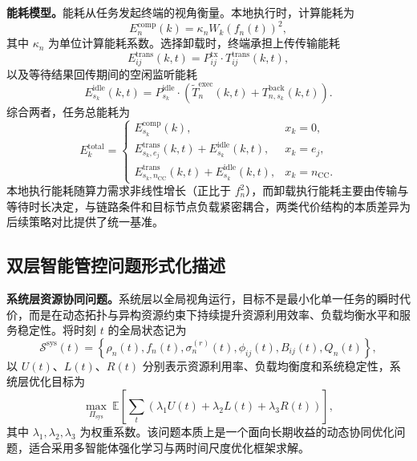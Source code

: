 \textbf{能耗模型。}能耗从任务发起终端的视角衡量。本地执行时，计算能耗为
\begin{equation}
  E_n^{\mathrm{comp}}(k)=\kappa_n W_k \left(f_n(t)\right)^2,
\end{equation}
其中 $\kappa_n$ 为单位计算能耗系数。选择卸载时，终端承担上传传输能耗
\begin{equation}
  E_{ij}^{\mathrm{trans}}(k,t)=P_{ij}^{\mathrm{tx}}\cdot T_{ij}^{\mathrm{trans}}(k,t),
\end{equation}
以及等待结果回传期间的空闲监听能耗
\begin{equation}
  E_{s_k}^{\mathrm{idle}}(k,t)=P_{s_k}^{\mathrm{idle}}\cdot\left(\tilde{T}_{n}^{\mathrm{exec}}(k,t)+T_{n,s_k}^{\mathrm{back}}(k,t)\right).
\end{equation}
综合两者，任务总能耗为
\begin{equation}
  E_k^{\mathrm{total}}=
  \begin{cases}
    E_{s_k}^{\mathrm{comp}}(k), & x_k=0, \\[4pt]
    E_{s_k,e_j}^{\mathrm{trans}}(k,t)+E_{s_k}^{\mathrm{idle}}(k,t), & x_k=e_j, \\[4pt]
    E_{s_k,n_{\mathrm{CC}}}^{\mathrm{trans}}(k,t)+E_{s_k}^{\mathrm{idle}}(k,t), & x_k=n_{\mathrm{CC}}.
  \end{cases}
\end{equation}
本地执行能耗随算力需求非线性增长（正比于 $f_n^2$），而卸载执行能耗主要由传输与等待时长决定，与链路条件和目标节点负载紧密耦合，两类代价结构的本质差异为后续策略对比提供了统一基准。

\subsection{双层智能管控问题形式化描述}

\textbf{系统层资源协同问题。}系统层以全局视角运行，目标不是最小化单一任务的瞬时代价，而是在动态拓扑与异构资源约束下持续提升资源利用效率、负载均衡水平和服务稳定性。将时刻 $t$ 的全局状态记为
\begin{equation}
  \mathcal{S}^{\mathrm{sys}}(t)=\left\{\rho_n(t),f_n(t),\sigma_n^{(r)}(t),\phi_{ij}(t),B_{ij}(t),Q_n(t)\right\},
\end{equation}
以 $U(t)$、$L(t)$、$R(t)$ 分别表示资源利用率、负载均衡度和系统稳定性，系统层优化目标为
\begin{equation}
  \max_{\Pi_{\mathrm{sys}}}\ \mathbb{E}\!\left[\sum_t \left(\lambda_1 U(t)+\lambda_2 L(t)+\lambda_3 R(t)\right)\right],
\end{equation}
其中 $\lambda_1,\lambda_2,\lambda_3$ 为权重系数。该问题本质上是一个面向长期收益的动态协同优化问题，适合采用多智能体强化学习与两时间尺度优化框架求解\cite{Tang2024TwoTimescaleJSAC,Xiu2025MARATD3,Feng2026LatencyAware}。

